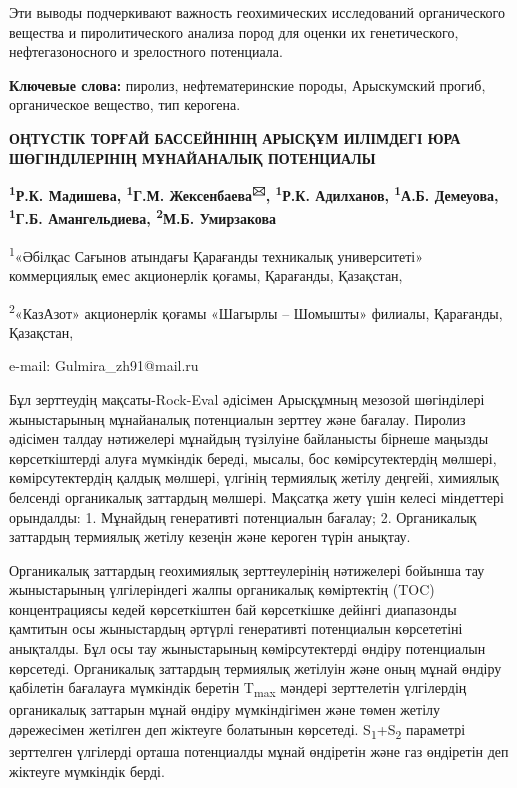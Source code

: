 Эти выводы подчеркивают важность геохимических исследований
органического вещества и пиролитического анализа пород для оценки их
генетического, нефтегазоносного и зрелостного потенциала.

{\bfseries Ключевые слова:} пиролиз, нефтематеринские породы, Арыскумский
прогиб, органическое вещество, тип керогена.

\begin{center}
{\large\bfseries ОҢТҮСТІК ТОРҒАЙ БАССЕЙНІНІҢ АРЫСҚҰМ ИІЛІМДЕГІ ЮРА ШӨГІНДІЛЕРІНІҢ
МҰНАЙАНАЛЫҚ ПОТЕНЦИАЛЫ}

{\bfseries \textsuperscript{1}Р.К. Мадишева, \textsuperscript{1}Г.М.
Жексенбаева\textsuperscript{🖂}, \textsuperscript{1}Р.К. Адилханов,
\textsuperscript{1}А.Б. Демеуова,\\
\textsuperscript{1}Г.Б. Амангельдиева, \textsuperscript{2}М.Б.
Умирзакова}

\textsuperscript{1}«Әбілқас Сағынов атындағы Қарағанды техникалық
университеті» коммерциялық емес акционерлік қоғамы, Қарағанды,
Қазақстан,

\textsuperscript{2}«КазАзот» акционерлік қоғамы «Шагырлы -- Шомышты»
филиалы, Қарағанды, Қазақстан,

e-mail: Gulmira\_zh91@mail.ru
\end{center}

Бұл зерттеудің мақсаты-Rock-Eval әдісімен Арысқұмның мезозой шөгінділері
жыныстарының мұнайаналық потенциалын зерттеу және бағалау. Пиролиз
әдісімен талдау нәтижелері мұнайдың түзілуіне байланысты бірнеше маңызды
көрсеткіштерді алуға мүмкіндік береді, мысалы, бос көмірсутектердің
мөлшері, көмірсутектердің қалдық мөлшері, үлгінің термиялық жетілу
деңгейі, химиялық белсенді органикалық заттардың мөлшері. Мақсатқа жету
үшін келесі міндеттері орындалды: 1. Мұнайдың генеративті потенциалын
бағалау; 2. Органикалық заттардың термиялық жетілу кезеңін және кероген
түрін анықтау.

Органикалық заттардың геохимиялық зерттеулерінің нәтижелері бойынша тау
жыныстарының үлгілеріндегі жалпы органикалық көміртектің (TOC)
концентрациясы кедей көрсеткіштен бай көрсеткішке дейінгі диапазонды
қамтитын осы жыныстардың әртүрлі генеративті потенциалын көрсететіні
анықталды. Бұл осы тау жыныстарының көмірсутектерді өндіру потенциалын
көрсетеді. Органикалық заттардың термиялық жетілуін және оның мұнай
өндіру қабілетін бағалауға мүмкіндік беретін T\textsubscript{max}
мәндері зерттелетін үлгілердің органикалық заттарын мұнай өндіру
мүмкіндігімен және төмен жетілу дәрежесімен жетілген деп жіктеуге
болатынын көрсетеді. S\textsubscript{1}+S\textsubscript{2} параметрі
зерттелген үлгілерді орташа потенциалды мұнай өндіретін және газ
өндіретін деп жіктеуге мүмкіндік берді.


